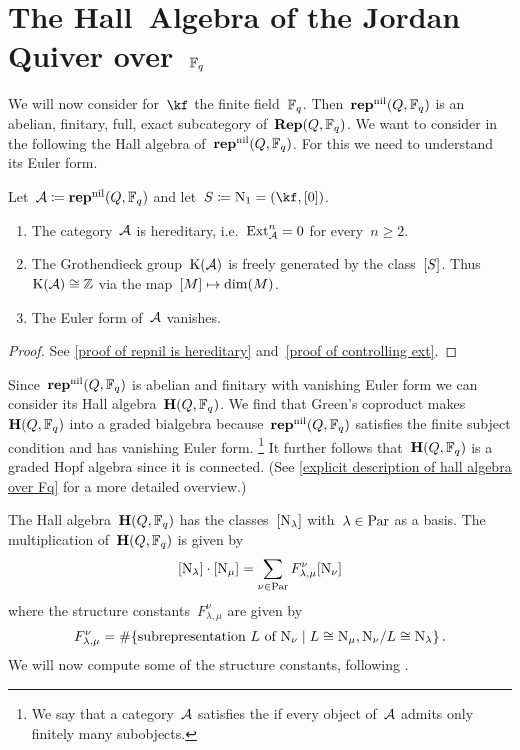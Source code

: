 \documentclass[a4paper, 11pt, twoside=semi]{scrartcl}
\begin{document}
\section{The Hall~Algebra of the Jordan Quiver over~$\mathbb{F}_q$}

We will now consider for~$\kf$ the finite field~$\mathbb{F}_q$.
Then~$\mathbf{rep}^{\mathrm{nil}}(Q, \mathbb{F}_q)$ is an abelian, finitary, full, exact subcategory of~$\mathbf{Rep}(Q, \mathbb{F}_q)$.
We want to consider in the following the Hall algebra of~$\mathbf{rep}^{\mathrm{nil}}(Q, \mathbb{F}_q)$.
For this we need to understand its Euler form.

\begin{proposition}
  Let~$\mathcal{A} \coloneqq \mathbf{rep}^{\mathrm{nil}}(Q, \mathbb{F}_q)$ and let~$S \defined \Nil_1 = (\kf, [0])$.
  \begin{enumerate}
    \item
      The category~$\mathcal{A}$ is hereditary, i.e.~$\operatorname{Ext}^n_{\mathcal{A}} = 0$ for every~$n \geq 2$.
    \item
      The Grothendieck group~$\operatorname{K}(\mathcal{A})$ is freely generated by the class~$[S]$.
      Thus~$\operatorname{K}(\mathcal{A}) \cong \mathbb{Z}$ via the map~$[M] \mapsto \dim(M)$.
    \item
      The Euler form of~$\mathcal{A}$ vanishes.
  \end{enumerate}
\end{proposition}

\begin{proof}
  See \cref{proof of repnil is hereditary} and~\cref{proof of controlling ext}.
\end{proof}

Since~$\mathbf{rep}^{\mathrm{nil}}(Q, \mathbb{F}_q)$ is abelian and finitary with vanishing Euler form we can consider its Hall algebra~$\mathbf{H}(Q, \mathbb{F}_q)$.
We find that Green’s coproduct makes~$\mathbf{H}(Q, \mathbb{F}_q)$ into a graded bialgebra because~$\mathbf{rep}^{\mathrm{nil}}(Q, \mathbb{F}_q)$ satisfies the finite subject condition and has vanishing Euler form.%
\footnote{%
  We say that a category~$\mathcal{A}$ satisfies the  if every object of~$\mathcal{A}$ admits only finitely many subobjects.
}
It further follows that~$\mathbf{H}(Q, \mathbb{F}_q)$ is a graded Hopf algebra since it is connected.
(See \cref{explicit description of hall algebra over Fq} for a more detailed overview.)

The Hall algebra~$\mathbf{H}(Q, \mathbb{F}_q)$ has the classes~$[\mathrm{N}_\lambda]$ with~$\lambda \in \mathrm{Par}$ as a basis.
The multiplication of~$\mathbf{H}(Q, \mathbb{F}_q)$ is given by
\[
  [\mathrm{N}_\lambda] \cdot [\mathrm{N}_\mu]
  =
  \sum_{\nu \in \mathrm{Par}}
  F^\nu_{\lambda, \mu} [\mathrm{N}_\nu]
\]
where the structure constants~$F^\nu_{\lambda, \mu}$ are given by
\[
  F^\nu_{\lambda, \mu}
  =
  \counting
  \{
    \text{subrepresentation~$L$ of~$\Nil_\nu$}
  \suchthat
    L \cong \Nil_\mu,
    \Nil_\nu/L \cong \Nil_\lambda
  \} \,.
\]
We will now compute some of the structure constants, following \cite[Example~2.2]{schiffmann_hall}.
\end{document}
